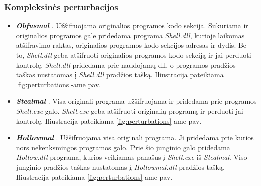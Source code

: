 \subsubsection{Kompleksinės perturbacijos}\label{sec:literature:perturbations:complex}
\begin{itemize}
    \item \textbf{\textit{Obfusmal}} \cite{zhongMalFoxCamouflagedAdversarial2024}. Užšifruojama originalios programos kodo sekcija. Sukuriama ir originalios programos gale pridedama programa \textit{Shell.dll}, kurioje laikomas atšifravimo raktas, originalios programos kodo sekcijos adresas ir dydis. Be to, \textit{Shell.dll} geba atšifruoti originalios programos kodo sekciją ir jai perduoti kontrolę. \textit{Shell.dll} pridedama prie naudojamų \acs{dll}, o programos pradžios taškas nustatomas į \textit{Shell.dll} pradžios tašką. Iliustracija pateikiama \ref{fig:perturbations}-ame pav.
    \item \textbf{\textit{Stealmal}} \cite{zhongMalFoxCamouflagedAdversarial2024}. Visa originali programa užšifruojama ir pridedama prie programos \textit{Shell.exe} galo. \textit{Shell.exe} geba atšifruoti originalią programą ir perduoti jai kontrolę. Iliustracija pateikiama \ref{fig:perturbations}-ame pav.
    \item \textbf{\textit{Hollowmal}} \cite{zhongMalFoxCamouflagedAdversarial2024}. Užšifruojama visa originali programa. Ji pridedama prie kurios nors nekenksmingos programos galo. Prie šio junginio galo pridedama \textit{Hollow.dll} programa, kurios veikiamas panašus į \textit{Shell.exe} iš \textit{Stealmal}. Viso junginio pradžios taškas nustatomas į \textit{Hollowmal.dll} pradžios tašką. Iliustracija pateikiama \ref{fig:perturbations}-ame pav.
\end{itemize}

